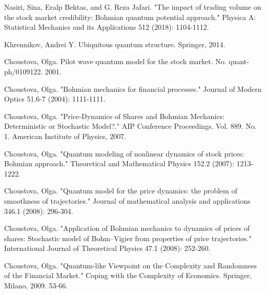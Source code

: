 \documentclass[a4paper,titlepage,12pt,fleqn,oneside]{report}
\begin{document}
\begin{thebibliography}{99}
\begin{LTRitems}
	Nasiri, Sina, Eralp Bektas, and G. Reza Jafari. "The impact of trading volume on the stock market credibility: Bohmian quantum potential approach." Physica A: Statistical Mechanics and its Applications 512 (2018): 1104-1112.
\end{LTRitems}

\begin{LTRitems}
	Khrennikov, Andrei Y. Ubiquitous quantum structure. Springer, 2014.
\end{LTRitems}

\begin{LTRitems}
	Choustova, Olga. Pilot wave quantum model for the stock market. No. quant-ph/0109122. 2001.
\end{LTRitems}

\begin{LTRitems}
	Choustova, Olga. "Bohmian mechanics for financial processes." Journal of Modern Optics 51.6-7 (2004): 1111-1111.
\end{LTRitems}

\begin{LTRitems}
	Choustova, Olga. "Price‐Dynamics of Shares and Bohmian Mechanics: Deterministic or Stochastic Model?." AIP Conference Proceedings. Vol. 889. No. 1. American Institute of Physics, 2007.
\end{LTRitems}

\begin{LTRitems}
	Choustova, Olga. "Quantum modeling of nonlinear dynamics of stock prices: Bohmian approach." Theoretical and Mathematical Physics 152.2 (2007): 1213-1222.
\end{LTRitems}

\begin{LTRitems}
	Choustova, Olga. "Quantum model for the price dynamics: the problem of smoothness of trajectories." Journal of mathematical analysis and applications 346.1 (2008): 296-304.
\end{LTRitems}

\begin{LTRitems}
	Choustova, Olga. "Application of Bohmian mechanics to dynamics of prices of shares: Stochastic model of Bohm–Vigier from properties of price trajectories." International Journal of Theoretical Physics 47.1 (2008): 252-260.
\end{LTRitems}

\begin{LTRitems}
	Choustova, Olga. "Quantum-like Viewpoint on the Complexity and Randomness of the Financial Market." Coping with the Complexity of Economics. Springer, Milano, 2009. 53-66.
\end{LTRitems}


\end{thebibliography}
\end{document}
